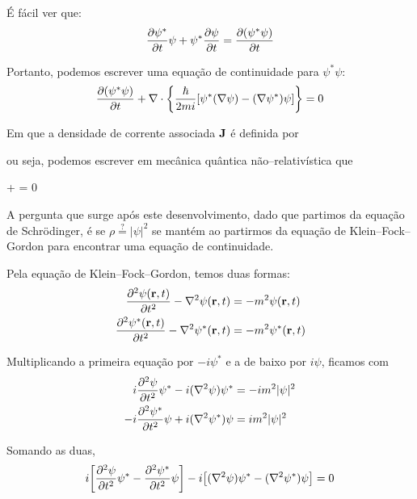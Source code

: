 É fácil ver que:
    \begin{equation*}
        \pdv{\psi^{\ast}}{t}\psi + \psi^{\ast}\pdv{\psi}{t} = \pdv{(\psi^{\ast}\psi)}{t}
    \end{equation*}

Portanto, podemos escrever uma equação de continuidade para $\psi^{\ast}\psi$:
    \begin{equation*}
        \pdv{(\psi^{\ast}\psi)}{t} + \vb{\nabla}\cdot\qty{
            \dfrac{\hbar}{2mi}\qty[
                \psi^{\ast}(\vb{\nabla}\psi) - (\vb{\nabla}\psi^{\ast})\psi
            ]
        } = 0
    \end{equation*}

Em que a densidade de corrente associada $\vb{J}$ é definida por
ou seja, podemos escrever em mecânica quântica não--relativística que
    \begin{answer}\label{eq: continuity equation}
         + \vb{\nabla}\cdot{} = 0
    \end{answer}

A pergunta que surge após este desenvolvimento, dado que partimos da equação de Schrödinger, é se $\rho \overset{?}{=} |\psi|^2$ se mantém ao partirmos da equação de Klein--Fock--Gordon para encontrar uma equação de continuidade.

Pela equação de Klein--Fock--Gordon, temos duas formas:
    \begin{align*}
        \pdv[2]{\psi(\vb{r},t)}{t} - \nabla^2\psi(\vb{r},t) &= -m^2 \psi(\vb{r},t) \\
        \pdv[2]{\psi^{\ast}(\vb{r},t)}{t} - \nabla^2\psi^{\ast}(\vb{r},t) &= -m^2 \psi^{\ast}(\vb{r},t)
    \end{align*}

Multiplicando a primeira equação por $-i\psi^{\ast}$ e a de baixo por $i\psi$, ficamos com
    \begin{align*}
        i\pdv[2]{\psi}{t}\psi^{\ast} - i(\vb{\nabla}^2\psi)\psi^{\ast} &= -im^2|\psi|^2 \\
        -i\pdv[2]{\psi^{\ast}}{t}\psi + i(\vb{\nabla}^2\psi^{\ast})\psi &= im^2|\psi|^2
    \end{align*}

Somando as duas,
    \begin{equation}\label{eq: summing two equations}
        i\qty[\pdv[2]{\psi}{t} \psi^{\ast} - \pdv[2]{\psi^{\ast}}{t}\psi] - i\qty[(\nabla^2\psi)\psi^{\ast} - (\nabla^2\psi^{\ast})\psi] = 0
    \end{equation}

